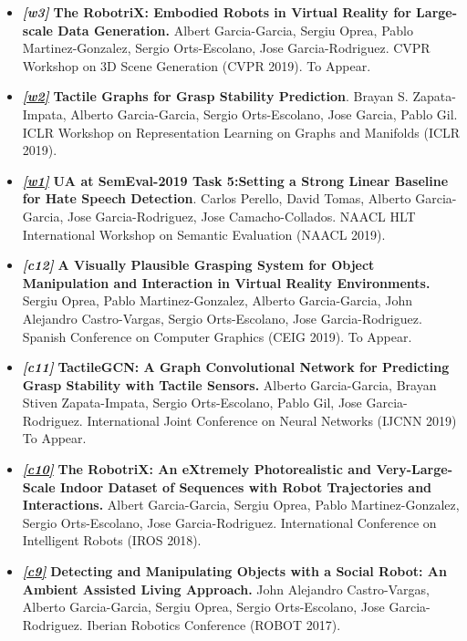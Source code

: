 \documentclass[8pt]{article}
\begin{document}
\begin{itemize}
    \item \emph{\textbf{[w3]}} \textbf{The RobotriX: Embodied Robots in Virtual Reality for Large-scale Data Generation.} Albert Garcia-Garcia, Sergiu Oprea, Pablo Martinez-Gonzalez, Sergio Orts-Escolano, Jose Garcia-Rodriguez. CVPR Workshop on 3D Scene Generation (CVPR 2019). To Appear.
    \item \emph{\textbf{\href{https://rlgm.github.io/papers/7.pdf}{[w2]}}} \textbf{Tactile Graphs for Grasp Stability Prediction}. Brayan S. Zapata-Impata, Alberto Garcia-Garcia, Sergio Orts-Escolano, Jose Garcia, Pablo Gil. ICLR Workshop on Representation Learning on Graphs and Manifolds (ICLR 2019).
    \item \emph{\textbf{\href{http://alt.qcri.org/semeval2019/data/uploads/semeval2019-proceedings.pdf}{[w1]}}} \textbf{UA at SemEval-2019 Task 5:Setting a Strong Linear Baseline for Hate Speech Detection}. Carlos Perello, David Tomas, Alberto Garcia-Garcia, Jose Garcia-Rodriguez, Jose Camacho-Collados. NAACL HLT International Workshop on Semantic Evaluation (NAACL 2019).
    \item \emph{\textbf{[c12]}} \textbf{A Visually Plausible Grasping System for Object Manipulation and Interaction in Virtual Reality Environments.} Sergiu Oprea, Pablo Martinez-Gonzalez, Alberto Garcia-Garcia, John Alejandro Castro-Vargas, Sergio Orts-Escolano, Jose Garcia-Rodriguez. Spanish Conference on Computer Graphics (CEIG 2019). To Appear.
    \item \emph{\textbf{[c11]}} \textbf{TactileGCN: A Graph Convolutional Network for Predicting Grasp Stability with Tactile Sensors.} Alberto Garcia-Garcia, Brayan Stiven Zapata-Impata, Sergio Orts-Escolano, Pablo Gil, Jose Garcia-Rodriguez. International Joint Conference on Neural Networks (IJCNN 2019) To Appear.
    \item \emph{\textbf{\href{https://ieeexplore.ieee.org/document/8594495}{[c10]}}} \textbf{The RobotriX: An eXtremely Photorealistic and Very-Large-Scale Indoor Dataset of Sequences with Robot Trajectories and Interactions.} Albert Garcia-Garcia, Sergiu Oprea, Pablo Martinez-Gonzalez, Sergio Orts-Escolano, Jose Garcia-Rodriguez. International Conference on Intelligent Robots (IROS 2018).
    \item \emph{\textbf{\href{https://link.springer.com/chapter/10.1007/978-3-319-70833-1_50}{[c9]}}} \textbf{Detecting and Manipulating Objects with a Social Robot: An Ambient Assisted Living Approach.} John Alejandro Castro-Vargas, Alberto Garcia-Garcia, Sergiu Oprea, Sergio Orts-Escolano, Jose Garcia-Rodriguez. Iberian Robotics Conference (ROBOT 2017).

\end{itemize}
\end{document}

